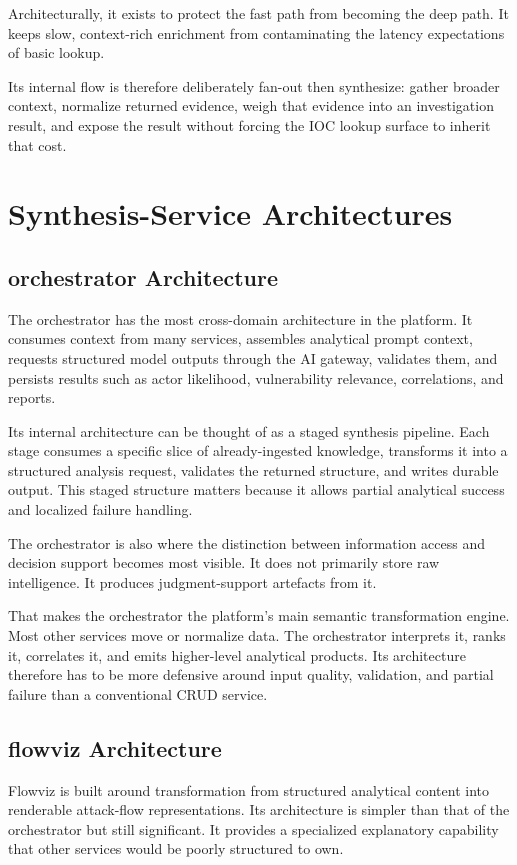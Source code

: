 Architecturally, it exists to protect the fast path from becoming the deep path. It keeps slow, context-rich enrichment from contaminating the latency expectations of basic lookup.

Its internal flow is therefore deliberately fan-out then synthesize: gather broader context, normalize returned evidence, weigh that evidence into an investigation result, and expose the result without forcing the IOC lookup surface to inherit that cost.

\section{Synthesis-Service Architectures}
\subsection{orchestrator Architecture}
The orchestrator has the most cross-domain architecture in the platform. It consumes context from many services, assembles analytical prompt context, requests structured model outputs through the AI gateway, validates them, and persists results such as actor likelihood, vulnerability relevance, correlations, and reports.

Its internal architecture can be thought of as a staged synthesis pipeline. Each stage consumes a specific slice of already-ingested knowledge, transforms it into a structured analysis request, validates the returned structure, and writes durable output. This staged structure matters because it allows partial analytical success and localized failure handling.

The orchestrator is also where the distinction between information access and decision support becomes most visible. It does not primarily store raw intelligence. It produces judgment-support artefacts from it.

That makes the orchestrator the platform's main semantic transformation engine. Most other services move or normalize data. The orchestrator interprets it, ranks it, correlates it, and emits higher-level analytical products. Its architecture therefore has to be more defensive around input quality, validation, and partial failure than a conventional CRUD service.

\subsection{flowviz Architecture}
Flowviz is built around transformation from structured analytical content into renderable attack-flow representations. Its architecture is simpler than that of the orchestrator but still significant. It provides a specialized explanatory capability that other services would be poorly structured to own.

